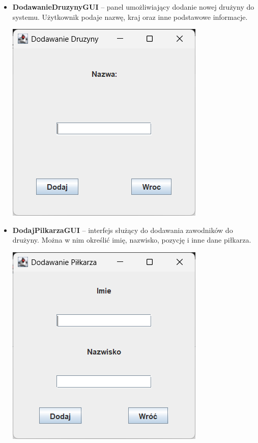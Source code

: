 \documentclass{urdpl}     %
\begin{document}
\begin{itemize}
  \item
  \begin{minipage}[t]{\linewidth}
    \textbf{DodawanieDruzynyGUI} -- panel umożliwiający dodanie nowej drużyny do systemu. Użytkownik podaje nazwę, kraj oraz inne podstawowe informacje.

    \vspace{0.3em}
    \begin{center}
      \includegraphics[width=0.7\linewidth]{dodajdruzyne.png}
      \label{fig:dodajdruzyne}
    \end{center}
  \end{minipage}

  \item
  \begin{minipage}[t]{\linewidth}
    \textbf{DodajPilkarzaGUI} -- interfejs służący do dodawania zawodników do drużyny. Można w nim określić imię, nazwisko, pozycję i inne dane piłkarza.

    \vspace{0.3em}
    \begin{center}
      \includegraphics[width=0.7\linewidth]{dodaj pilkaza.png}
      \label{fig:dodajpilkarza}
    \end{center}
  \end{minipage}


\end{itemize}
\end{document}
